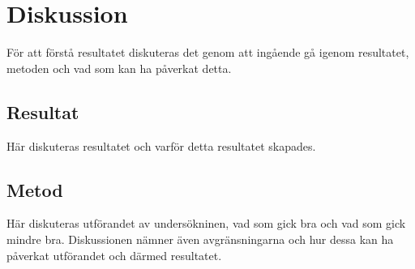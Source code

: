 \section{Diskussion}
\label{sec:tim-discussion}
För att förstå resultatet diskuteras det genom att ingående gå igenom resultatet, metoden och vad som kan ha påverkat detta.

\subsection{Resultat}
\label{subsec:tim-discussion-results}
Här diskuteras resultatet och varför detta resultatet skapades.
\subsection{Metod}
\label{subsec:tim-discussion-method}
Här diskuteras utförandet av undersökninen, vad som gick bra och vad som gick mindre bra. Diskussionen nämner även avgränsningarna och hur dessa kan ha påverkat utförandet och därmed resultatet.


